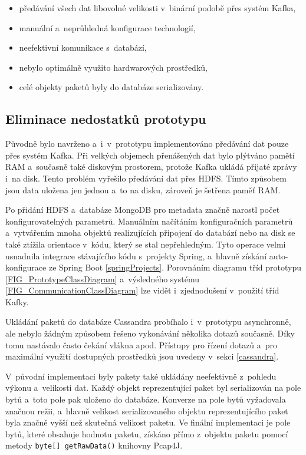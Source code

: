 \begin{itemize}
    \item předávání všech dat libovolné velikosti v~binární podobě přes systém Kafka,
    
    \item manuální a~neprůhledná konfigurace technologií,
    
    \item neefektivní komunikace s~databází,
    
    \item nebylo optimálně využito hardwarových prostředků,
    
    \item celé objekty paketů byly do databáze serializovány.
\end{itemize}

\subsection{Eliminace nedostatků prototypu} \label{improvementsInImpl}
Původně bylo navrženo a~i~v~prototypu implementováno předávání dat pouze přes systém Kafka. Při velkých objemech přenášených dat bylo plýtváno pamětí RAM a~současně také diskovým prostorem, protože Kafka ukládá přijaté zprávy i~na disk. Tento problém vyřešilo předávání dat přes HDFS. Tímto způsobem jsou data uložena jen jednou a~to na disku, zároveň je šetřena paměť RAM.

Po přidání HDFS a~databáze MongoDB pro metadata značně narostl počet konfigurovatelných parametrů. Manuálním načítáním konfiguračních parametrů a~vytvářením mnoha objektů realizujících připojení do databází nebo na disk se také ztížila orientace v~kódu, který se stal nepřehledným. Tyto operace velmi usnadnila integrace stávajícího kódu s~projekty Spring, a~hlavně získání auto-konfigurace ze Spring Boot \ref{springProjects}. Porovnáním diagramu tříd prototypu \ref{FIG_PrototypeClassDiagram} a~výsledného systému \ref{FIG_CommunicationClassDiagram} lze vidět i~zjednodušení v~použití tříd Kafky.

\noindent Ukládání paketů do databáze Cassandra probíhalo i~v~prototypu asynchronně, ale nebylo žádným způsobem řešeno vykonávání několika dotazů současně. Díky tomu nastávalo často čekání vlákna apod. Přístupy pro řízení dotazů a~pro maximální využití dostupných prostředků jsou uvedeny v~sekci \ref{cassandra}.

V~původní implementaci byly pakety také ukládány neefektivně z~pohledu výkonu a~velikosti dat. Každý objekt reprezentující paket byl serializován na pole bytů a~toto pole pak uloženo do databáze. Konverze na pole bytů vyžadovala značnou režii, a~hlavně velikost serializovaného objektu reprezentujícího paket byla značně vyšší než skutečná velikost paketu. Ve finální implementaci je pole bytů, které obsahuje hodnotu paketu, získáno přímo z~objektu paketu pomocí metody \texttt{byte[] getRawData()} knihovny Pcap4J.

